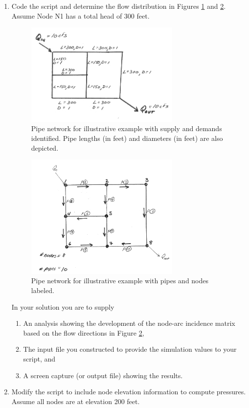 \begin{enumerate}
\item Code the script and determine the flow distribution in Figures \ref{fig:pipe-net} and \ref{fig:pipe-net-loops}.  Assume Node N1 has a total head of 300 feet. 

\begin{figure}[h!] %
   \centering
   \includegraphics[width=3in]{./8-PipeNetworkHydraulics/pipe-net.jpg} 
   \caption{Pipe network for illustrative example with supply and demands identified.  Pipe lengths (in feet) and diameters (in feet) are also depicted.}
   \label{fig:pipe-net}
\end{figure}

\begin{figure}[h!] %
   \centering
   \includegraphics[width=3in]{./8-PipeNetworkHydraulics/pipe-net-loops.jpg} 
   \caption{Pipe network for illustrative example with pipes and nodes labeled.}
   \label{fig:pipe-net-loops}
\end{figure}

In your solution you are to supply
\begin{enumerate}
\item An analysis showing the development of the node-arc incidence matrix based on the flow directions in Figure \ref{fig:pipe-net-loops},
\item The input file you constructed to provide the simulation values to your script, and
\item A screen capture (or output file) showing the results.
\end{enumerate}

\item Modify the script to include node elevation information to compute pressures.  Assume all nodes are at elevation 200 feet.

\end{enumerate}
